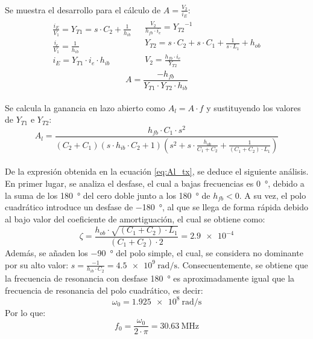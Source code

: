 \paragraph{}
Se muestra el desarrollo para el c\'alculo de $A = \frac{V_2}{i_E}$:
\[
\begin{array}{rl} 
      \begin{array}{l}
   \frac{i_E}{V_1} = Y_{T1} = s\cdot C_2 + \frac{1}{h_{ib}} \\
   \frac{i_e}{V_{1}} = \frac{1}{h_{ib}} \\
   i_E = Y_{T1} \cdot i_e \cdot h_{ib}
      \end{array}
      &
      \begin{array}{r}
   \frac{V_2}{h_{fb}\cdot i_e} = {Y_{T2}}^{-1} \\
   Y_{T2} = s\cdot C_2 + s\cdot C_1 + \frac{1}{s\cdot L_1} + h_{ob} \\
   V_2 = \frac{h_{fb}\cdot i_e}{Y_{T2}} 
      \end{array}
\end{array}
\]
\begin{equation}
   A = \frac{-h_{fb}}{Y_{T1} \cdot Y_{T2} \cdot h_{ib}} 
\end{equation}
\paragraph{}
Se calcula la ganancia en lazo abierto como $A_l = A \cdot f$ y sustituyendo los valores de $Y_{T1}$ e $Y_{T2}$:
\begin{equation}
   \label{eq:Al_tx}
   A_l = \frac{h_{fb} \cdot C_1 \cdot s^2}{ \left( C_2+C_1 \right) \left( s \cdot h_{ib} \cdot C_2 + 1\right) \left( s^2 + s \cdot \frac{h_{ob}}{C_1 + C_2} + \frac{1}{(C_1 + C_2)\cdot L_1}\right) }
\end{equation}
\paragraph{}
De la expresi\'on obtenida en la ecuaci\'on \ref{eq:Al_tx}, se deduce el siguiente an\'alisis. 
En primer lugar, se analiza el desfase, el cual a bajas frecuencias es \SI{0}{\degree}, debido a la suma de los \SI{180}{\degree} del cero doble junto a los \SI{180}{\degree} de $h_{fb} < 0$. A su vez, el polo cuadr\'atico introduce un desfase de \SI{-180}{\degree}, al que se llega de forma r\'apida debido al bajo valor del coeficiente de amortiguaci\'on, el cual se obtiene como:$$\zeta = \frac{h_{ob} \cdot \sqrt{(C_1+C_2) \cdot L_1}}{(C_1+C_2) \cdot 2} = \num{2.9e-4}$$
Adem\'as, se añaden los \SI{-90}{\degree} del polo simple, el cual, se considera no dominante por su alto valor: $s = \frac{-1}{h_{ib} \cdot C_2} = \SI{4.5e9}{\radian\per\second}$. 
Consecuentemente, se obtiene que la frecuencia de resonancia con desfase \SI{180}{\degree} es aproximadamente igual que la frecuencia de resonancia del polo cuadrático, es decir:
$$\omega_0 = \SI{1.925e8}{\radian\per\second}$$ 
Por lo que:
\begin{equation}
   f_0 = \frac{\omega_0}{2\cdot\pi} = \SI{30.63}{\mega\hertz}
\end{equation}
